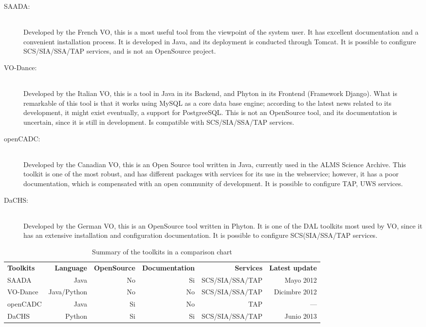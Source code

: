 \documentclass[]{spie}
\begin{document}
\begin{description}
    \item[SAADA:] \hfill \\
        Developed by the French VO, this is a most useful tool from the viewpoint of the system user.  It has excellent documentation and a convenient installation process. It is developed in Java, and its deployment is conducted through Tomcat.  It is possible to configure SCS/SIA/SSA/TAP services, and is not an OpenSource project.
    \item[VO-Dance:] \hfill \\
        Developed  by the Italian VO, this is a tool in Java in its Backend, and Phyton in its Frontend (Framework Django).  What is remarkable of this tool is that it works using MySQL as a core data base engine; according to the latest news related to its development, it might exist eventually, a support for PostgreeSQL.  This is not an OpenSource tool, and its documentation is uncertain, since it is still in development.  Is compatible with SCS/SIA/SSA/TAP services.
    \item[openCADC:] \hfill \\
        Developed by the Canadian VO, this is an Open Source tool written in Java, currently used in the ALMS Science Archive.  This toolkit is one of the most robust, and has different packages with services for its use in the webservice; however, it has a poor documentation, which is compensated with an open community of development.  It is possible to configure TAP, UWS services.
    \item[DaCHS:] \hfill \\
        Developed by the German VO, this is an OpenSource tool written in Phyton.  It is one of the DAL toolkits most used by VO, since it has an extensive installation and configuration documentation. It is possible to configure SCS(SIA/SSA/TAP services.
\end{description}

\begin{table}[h]
\caption{Summary of the toolkits in a comparison chart} 
\label{table:toolkits}
\begin{center}       
\begin{tabular}{lrrrrr}
    {\bf Toolkits} & {\bf Language} & {\bf OpenSource} & {\bf Documentation} & {\bf Services} & {\bf Latest update}  \\
    SAADA          & Java           & No               & Si                  & SCS/SIA/SSA/TAP & Mayo 2012     \\
    VO-Dance       & Java/Python    & No               & No                  & SCS/SIA/SSA/TAP & Dicimbre 2012 \\
    openCADC       & Java           & Si               & No                  & TAP             & ---           \\
    DaCHS          & Python         & Si               & Si                  & SCS/SIA/SSA/TAP & Junio 2013    \\
\end{tabular}
\end{center}
\end{table}
\end{document}
